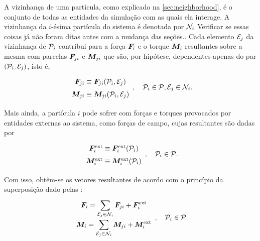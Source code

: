 A vizinhança de uma partícula, como explicado na \cref{sec:neighborhood}, é o conjunto de todas as entidades da simulação com as quais ela interage. A vizinhança da \(i\)-ésima partícula do sistema é denotada por \(\mathcal{N}_{i}\) \alert{Verificar se essas coisas já não foram ditas antes com a mudança das seções.}. Cada elemento \(\mathcal{E}_{j}\) da vizinhança de \(\particlei\) contribui para a força \(\bm{F}_{i}\) e o torque \(\bm{M}_{i}\) resultantes sobre a mesma com parcelas \({\bm{F}}_{j i}\) e \({\bm{M}}_{j i}\) que são, por hipótese, dependentes apenas do par \(\orderedPair{\particlei}{\elementj}\), isto é,
\begin{equation*}
	\def\arraystretch{1.5}
	\begin{array}{c}
		\displaystyle \forceji \equiv \forceji\pqty{\particlei, \elementj} \\
		\displaystyle \torqueji \equiv \torqueji\pqty{\particlei, \elementj} \\
	\end{array}, \quad \particlei \in \particleSet, \elementj \in \neighborhoodi.
\end{equation*}

Mais ainda, a partícula \(i\) pode sofrer com forças e torques provocados por entidades externas ao sistema, como forças de campo, cujas resultantes são dadas por
\begin{equation*}
	\def\arraystretch{1.5}
	\begin{array}{c}
		\external\forcei \equiv \external\forcei\pqty{\particlei} \\
		\external\torquei \equiv \external\torquei\pqty{\particlei} \\
	\end{array}, \quad \particlei \in \particleSet.
\end{equation*}
 
Com isso, obtêm-se os vetores resultantes de acordo com o princípio da superposição dado pelas  :
\begin{equation*}
	\def\arraystretch{1.5}
	\begin{array}{c}
		\resultingForcei = \dsum_{\elementj\in\neighborhoodi}\forceji + \external\forcei\\
		\resultingTorquei = \dsum_{\elementj\in\neighborhoodi}\torqueji + \external\torquei
	\end{array}, \quad \particlei\in\particleSet.
\end{equation*}

